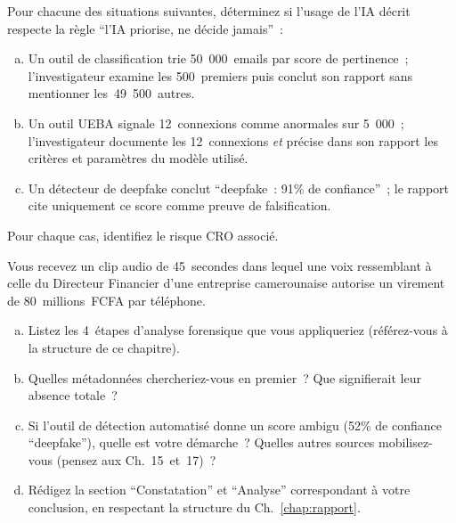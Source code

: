 \bigskip

\begin{boxexo}[title={\ding{45}\quad Exercice~23.1. Triage vs décision \niveaubase}]
Pour chacune des situations suivantes, déterminez si l'usage de
l'IA décrit respecte la règle ``l'IA priorise, ne décide jamais''~:
\begin{enumerate}[(a)]
    \item Un outil de classification trie 50~000~emails par score
          de pertinence~; l'investigateur examine les 500~premiers
          puis conclut son rapport sans mentionner les~49~500~autres.
    \item Un outil UEBA signale 12~connexions comme anormales sur
          5~000~; l'investigateur documente les 12~connexions
          \emph{et} précise dans son rapport les critères et
          paramètres du modèle utilisé.
    \item Un détecteur de deepfake conclut ``deepfake~: 91\%
          de confiance''~; le rapport cite uniquement ce score
          comme preuve de falsification.
\end{enumerate}
Pour chaque cas, identifiez le risque CRO associé.
\end{boxexo}

\begin{boxexo}[title={\ding{45}\quad Exercice~23.2. Analyse de deepfake \niveaumoyen}]
Vous recevez un clip audio de 45~secondes dans lequel une voix
ressemblant à celle du Directeur Financier d'une entreprise
camerounaise autorise un virement de 80~millions~FCFA par téléphone.
\begin{enumerate}[(a)]
    \item Listez les 4~étapes d'analyse forensique que vous
          appliqueriez (référez-vous à la structure de ce chapitre).
    \item Quelles métadonnées chercheriez-vous en premier~? Que
          signifierait leur absence totale~?
    \item Si l'outil de détection automatisé donne un score
          ambigu (52\% de confiance ``deepfake''), quelle est votre
          démarche~? Quelles autres sources mobilisez-vous
          (pensez aux Ch.~15~et~17)~?
    \item Rédigez la section ``Constatation'' et ``Analyse''
          correspondant à votre conclusion, en respectant
          la structure du Ch.~\ref{chap:rapport}.
\end{enumerate}
\end{boxexo}

